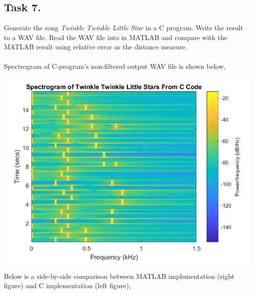 \documentclass{article}
\begin{document}
    \subsection{Task 7.} Generate the song \textit{Twinkle Twinkle Little Star} in a C program. Write the result to a WAV file. Read the WAV file into in MATLAB and compare with the MATLAB result using relative error as the distance measure.\\
        \vspace{5mm}\\
        Spectrogram of C-program's non-filtered output WAV file is shown below,
        \begin{center}
            \includegraphics[width=\textwidth]{task7.jpg}
        \end{center}
        Below is a side-by-side comparison between MATLAB implementation (right figure) and C implementation (left figure),
\end{document}
